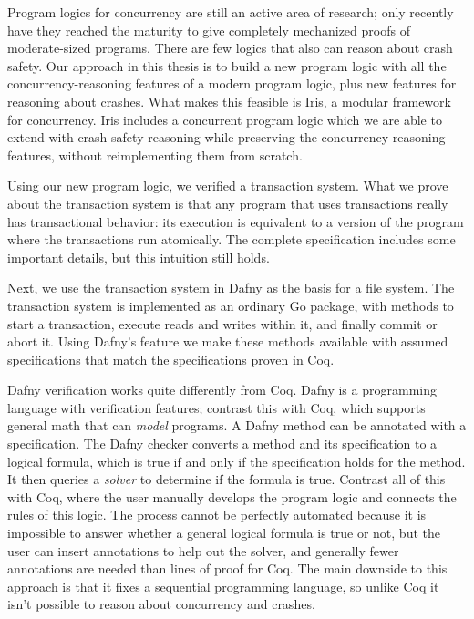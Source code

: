 Program logics for concurrency are still an active area of research; only
recently have they reached the maturity to give completely mechanized proofs of
moderate-sized programs. There are few logics that also can reason about crash
safety. Our approach in this thesis is to build a new program logic with all the
concurrency-reasoning features of a modern program logic, plus new features for
reasoning about crashes. What makes this feasible is Iris, a modular framework
for concurrency. Iris includes a concurrent program logic which we are able to
extend with crash-safety reasoning while preserving the concurrency reasoning
features, without reimplementing them from scratch.

Using our new program logic, we verified a transaction system.
What we prove about the transaction system is that any program that uses
transactions really has transactional behavior: its execution is equivalent to a
version of the program where the transactions run atomically. The complete
specification includes some important details, but this intuition still holds.

Next, we use the transaction system in Dafny as the basis for a file system.
The transaction system is implemented as an ordinary Go package, with methods to
start a transaction, execute reads and writes within it, and finally commit or
abort it. Using Dafny's  feature we make these methods available with
assumed specifications that match the specifications proven in Coq.

Dafny verification works quite differently from Coq. Dafny is a programming
language with verification features; contrast this with Coq, which supports
general math that can \emph{model} programs. A Dafny method can be annotated
with a specification. The Dafny checker converts a method and its specification
to a logical formula, which is true if and only if the specification holds for
the method. It then queries a \emph{solver} to determine if the formula is true.
Contrast all of this with Coq, where the user manually develops the program
logic and connects the rules of this logic. The process cannot be perfectly
automated because it is impossible to answer whether a general logical formula
is true or not, but the user can insert annotations to help out the solver, and
generally fewer annotations are needed than lines of proof for Coq. The main
downside to this approach is that it fixes a sequential programming language, so
unlike Coq it isn't possible to reason about concurrency and crashes.

